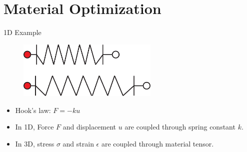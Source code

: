 \section{Material Optimization}

\begin{frame}{1D Example}
\begin{figure}
\includegraphics[width=0.6\textwidth]{Images/spring_stretch.pdf}
\end{figure}

\begin{itemize}
\item Hook's law: $F = -k u$
\pause \item In 1D, Force $F$ and displacement $u$ are coupled through spring constant $k$.
\pause \item In 3D, stress $\sigma$ and strain $\epsilon$ are coupled through
material tensor.
\end{itemize}
\end{frame}

